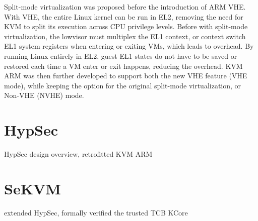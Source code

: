 Split-mode virtualization was proposed before the introduction of ARM VHE. With
VHE, the entire Linux kernel can be run in EL2, removing the need for KVM to
split its execution across CPU privilege levels. Before with split-mode
virtualization, the lowvisor must multiplex the EL1 context, or context switch
EL1 system registers when entering or exiting VMs, which leads to overhead. By
running Linux entirely in EL2, guest EL1 states do not have to be saved or
restored each time a VM enter or exit happens, reducing the overhead. KVM ARM
was then further developed to support both the new VHE feature (VHE mode),
while keeping the option for the original split-mode virtualization, or Non-VHE
(NVHE) mode.


\section{HypSec}

HypSec design overview, retrofitted KVM ARM

\section{SeKVM}
\label{sec:sekvmintro}

extended HypSec, formally verified the trusted TCB KCore





